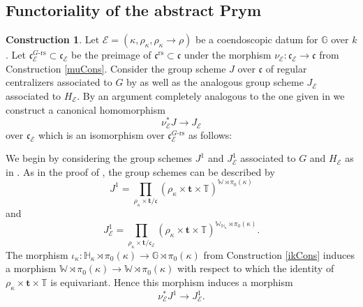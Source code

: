 \documentclass{article}
\newcommand{\BG}{{\mathbb{G}}}
\newcommand{\BH}{{\mathbb{H}}}
\newcommand{\BT}{{\mathbb{T}}}
\newcommand{\BW}{{\mathbb{W}}}
\newcommand{\CE}{{\mathcal E}}
\theoremstyle{definition}
\newtheorem{construction}[definition]{Construction}
\theoremstyle{plain}
\begin{document}
\subsection{Functoriality of the abstract Prym}
\begin{construction} \label{JFunct}
    Let $\CE=(\kappa,\rho_\kappa,\rho_\kappa \to \rho)$ be a coendoscopic datum for $\BG$ over $k$. Let $\mathfrak{c}_\CE^{\text{$G$-rs}} \subset \mathfrak{c}_\CE$ be the preimage of $\mathfrak{c}^\text{rs} \subset \mathfrak{c}$ under the morphism $\nu_\CE\colon \mathfrak{c}_\CE \to \mathfrak{c}$ from Construction \ref{muCons}.  Consider the group scheme $J$ over $\mathfrak{c}$ of regular centralizers associated to $G$ by \cite[Lemma 2.1.1]{MR2653248} as well as the analogous group scheme $J_\CE$ associated to $H_\CE$. By an argument completely analogous to the one given in \cite[Proposition 2.5.1]{MR2653248} we construct a canonical homomorphism
    \begin{equation*}
      \nu_\CE^* J \to J_{\CE}
    \end{equation*}
over $\mathfrak{c}_\CE$ which is an isomorphism over $\mathfrak{c}_\CE^{\text{$G$-rs}}$ as follows: 

We begin by considering the group schemes $J^1$ and $J^1_\CE$ associated to $G$ and $H_\CE$ as in \cite[2.4]{MR2653248}. As in the proof of \cite[Proposition 2.5.1]{MR2653248}, the group schemes can be described by
\begin{equation*}
  J^1=\prod_{\rho_\kappa \times \mathbf{t}/ \mathfrak{c}}(\rho_\kappa \times \mathbf{t} \times \BT)^{\BW \rtimes \pi_0(\kappa)}
\end{equation*}
and
\begin{equation*}
  J^1_\CE=\prod_{\rho_\kappa \times \mathbf{t}/ \mathfrak{c}_\CE}(\rho_\kappa \times \mathbf{t} \times \BT)^{\BW_{\BH_\kappa} \rtimes \pi_0(\kappa)}.
\end{equation*}
The morphism $\iota_\kappa\colon \BH_\kappa \rtimes \pi_0(\kappa)  \to \BG \rtimes \pi_0(\kappa)$ from Construction \ref{ikCons} induces a morphism $\BW \rtimes \pi_0(\kappa) \to \BW \rtimes \pi_0(\kappa)$ with respect to which the identity of $\rho_\kappa \times \mathbf{t} \times \BT$ is equivariant. Hence this morphism induces a morphism
\begin{equation*}
  \nu_\CE^*J^1 \to J^1_\CE.
\end{equation*}


\end{construction}
\end{document}
